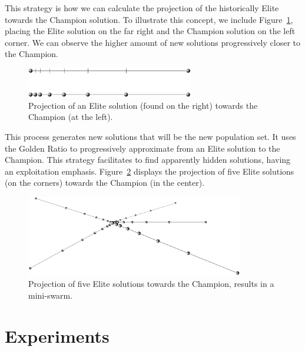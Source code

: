 \documentclass[graybox]{svmult}
\begin{document}
        This strategy is how we can calculate the projection of the
        historically Elite towards the Champion solution. To illustrate this
        concept, we include Figure~\ref{fig.elite_projection}, placing the
        Elite solution on the far right and the Champion solution on the left
        corner. We can observe the higher amount of new solutions progressively
        closer to the Champion.
        
        \begin{figure}
            \centering
            \includegraphics[width=0.65\textwidth]{img/fig_elite_projection.pdf}
            \caption{Projection of an Elite solution (found on the right) towards the Champion (at the left).} \label{fig.elite_projection}
            \end{figure}

        This process generates new solutions that will be the new population set. It
        uses the Golden Ratio to progressively approximate from an Elite solution to
        the Champion. This strategy facilitates to find apparently hidden solutions,
        having an exploitation emphasis. Figure~\ref{fig.elite_projection_swarm}
        displays the projection of five Elite solutions (on the corners) towards the
        Champion (in the center).

        \begin{figure}
            \centering
            \includegraphics[width=0.85\textwidth]{img/fig_elite_projection_swarm.pdf}
            \caption{Projection of five Elite solutions towards the Champion, results in a mini-swarm.} \label{fig.elite_projection_swarm}
            \end{figure}
        
        \FloatBarrier

\section{Experiments}
    \label{section.experiments}
\end{document}
